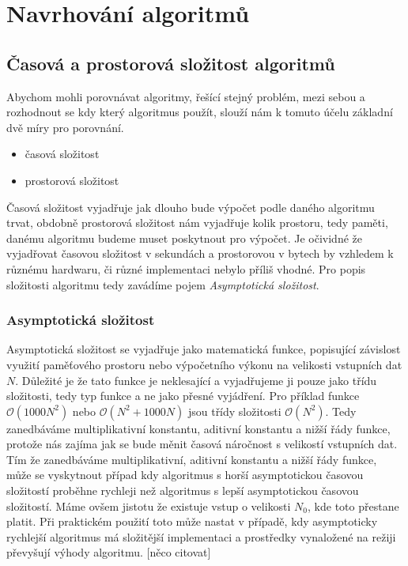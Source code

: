 \chapter{Navrhování algoritmů}
\label{chap:navrhovanialgoritmu}
	

\section{Časová a prostorová složitost algoritmů}
	Abychom mohli porovnávat algoritmy, řešící stejný problém, mezi sebou a rozhodnout se kdy který algoritmus použít, slouží nám k tomuto účelu základní dvě míry pro porovnání.
\begin{itemize}
	\item časová složitost
	\item prostorová složitost
\end{itemize}
	Časová složitost vyjadřuje jak dlouho bude výpočet podle daného algoritmu trvat, obdobně prostorová složitost nám vyjadřuje kolik prostoru, tedy paměti, danému algoritmu budeme muset poskytnout pro výpočet. Je očividné že vyjadřovat časovou složitost v sekundách a prostorovou v bytech by vzhledem k různému hardwaru, či různé implementaci nebylo příliš vhodné. Pro popis složitosti algoritmu tedy zavádíme pojem \textit{Asymptotická složitost}.
	
\subsection{Asymptotická složitost}
	Asymptotická složitost se vyjadřuje jako matematická funkce, popisující závislost využití paměťového prostoru nebo výpočetního výkonu na velikosti vstupních dat $N$. Důležité je že tato funkce je neklesající a vyjadřujeme ji pouze jako třídu složitosti, tedy typ funkce a ne jako přesné vyjádření. Pro příklad funkce $\mathcal{O} (1000N^2) $ nebo $\mathcal{O} (N^2 + 1000N)$ jsou třídy složitosti $\mathcal{O} (N^2)$. Tedy zanedbáváme multiplikativní konstantu, aditivní konstantu a nižší řády funkce, protože nás zajíma jak se bude měnit časová náročnost s velikostí vstupních dat.
	Tím že zanedbáváme multiplikativní, aditivní konstantu a nižší řády funkce, může se vyskytnout případ kdy algoritmus s horší asymptotickou časovou složitostí proběhne rychleji než algoritmus s lepší asymptotickou časovou složitostí. Máme ovšem jistotu že existuje vstup o velikosti $N_0$, kde toto přestane platit. Při praktickém použití toto může nastat v případě, kdy asymptoticky rychlejší algoritmus má složitější implementaci a prostředky vynaložené na režiji převyšují výhody algoritmu. [něco citovat]
	
